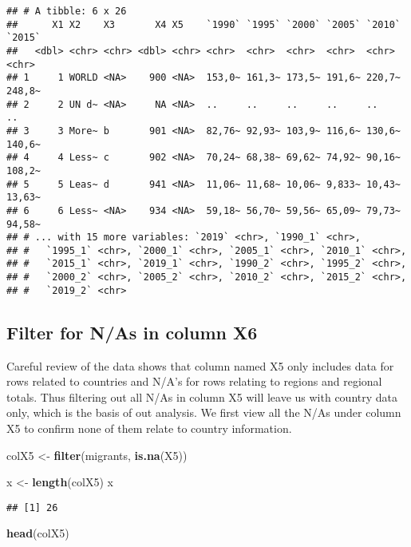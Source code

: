 \documentclass[]{article}
\newenvironment{Shaded}{\begin{snugshade}}{\end{snugshade}}
\newcommand{\KeywordTok}[1]{\textcolor[rgb]{0.13,0.29,0.53}{\textbf{#1}}}
\newcommand{\StringTok}[1]{\textcolor[rgb]{0.31,0.60,0.02}{#1}}
\newcommand{\NormalTok}[1]{#1}
\begin{document}
\begin{verbatim}
## # A tibble: 6 x 26
##      X1 X2    X3       X4 X5    `1990` `1995` `2000` `2005` `2010` `2015`
##   <dbl> <chr> <chr> <dbl> <chr> <chr>  <chr>  <chr>  <chr>  <chr>  <chr> 
## 1     1 WORLD <NA>    900 <NA>  153,0~ 161,3~ 173,5~ 191,6~ 220,7~ 248,8~
## 2     2 UN d~ <NA>     NA <NA>  ..     ..     ..     ..     ..     ..    
## 3     3 More~ b       901 <NA>  82,76~ 92,93~ 103,9~ 116,6~ 130,6~ 140,6~
## 4     4 Less~ c       902 <NA>  70,24~ 68,38~ 69,62~ 74,92~ 90,16~ 108,2~
## 5     5 Leas~ d       941 <NA>  11,06~ 11,68~ 10,06~ 9,833~ 10,43~ 13,63~
## 6     6 Less~ <NA>    934 <NA>  59,18~ 56,70~ 59,56~ 65,09~ 79,73~ 94,58~
## # ... with 15 more variables: `2019` <chr>, `1990_1` <chr>,
## #   `1995_1` <chr>, `2000_1` <chr>, `2005_1` <chr>, `2010_1` <chr>,
## #   `2015_1` <chr>, `2019_1` <chr>, `1990_2` <chr>, `1995_2` <chr>,
## #   `2000_2` <chr>, `2005_2` <chr>, `2010_2` <chr>, `2015_2` <chr>,
## #   `2019_2` <chr>
\end{verbatim}

\subsection{Filter for N/As in column
X6}\label{filter-for-nas-in-column-x6}

Careful review of the data shows that column named X5 only includes data
for rows related to countries and N/A's for rows relating to regions and
regional totals. Thus filtering out all N/As in column X5 will leave us
with country data only, which is the basis of out analysis. We first
view all the N/As under column X5 to confirm none of them relate to
country information.

\begin{Shaded}
\begin{Highlighting}[]
\NormalTok{colX5 <-}\StringTok{ }\KeywordTok{filter}\NormalTok{(migrants, }\KeywordTok{is.na}\NormalTok{(X5))}

\NormalTok{x <-}\StringTok{ }\KeywordTok{length}\NormalTok{(colX5)}
\NormalTok{x}
\end{Highlighting}
\end{Shaded}

\begin{verbatim}
## [1] 26
\end{verbatim}

\begin{Shaded}
\begin{Highlighting}[]
\KeywordTok{head}\NormalTok{(colX5)}
\end{Highlighting}
\end{Shaded}
\end{document}
